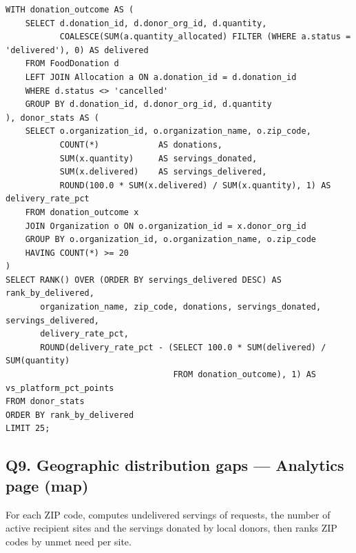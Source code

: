 \documentclass[11pt,letterpaper]{article}
\begin{document}
\begin{lstlisting}
WITH donation_outcome AS (
    SELECT d.donation_id, d.donor_org_id, d.quantity,
           COALESCE(SUM(a.quantity_allocated) FILTER (WHERE a.status = 'delivered'), 0) AS delivered
    FROM FoodDonation d
    LEFT JOIN Allocation a ON a.donation_id = d.donation_id
    WHERE d.status <> 'cancelled'
    GROUP BY d.donation_id, d.donor_org_id, d.quantity
), donor_stats AS (
    SELECT o.organization_id, o.organization_name, o.zip_code,
           COUNT(*)            AS donations,
           SUM(x.quantity)     AS servings_donated,
           SUM(x.delivered)    AS servings_delivered,
           ROUND(100.0 * SUM(x.delivered) / SUM(x.quantity), 1) AS delivery_rate_pct
    FROM donation_outcome x
    JOIN Organization o ON o.organization_id = x.donor_org_id
    GROUP BY o.organization_id, o.organization_name, o.zip_code
    HAVING COUNT(*) >= 20
)
SELECT RANK() OVER (ORDER BY servings_delivered DESC) AS rank_by_delivered,
       organization_name, zip_code, donations, servings_donated, servings_delivered,
       delivery_rate_pct,
       ROUND(delivery_rate_pct - (SELECT 100.0 * SUM(delivered) / SUM(quantity)
                                  FROM donation_outcome), 1) AS vs_platform_pct_points
FROM donor_stats
ORDER BY rank_by_delivered
LIMIT 25;
\end{lstlisting}

\subsection*{Q9. Geographic distribution gaps --- Analytics page (map)}
For each ZIP code, computes undelivered servings of requests, the number of active recipient sites and the servings donated by local donors, then ranks ZIP codes by unmet need per site.
\end{document}
